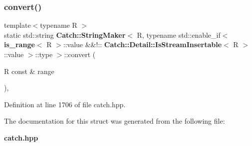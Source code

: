 \subsubsection{convert()}
{\footnotesize\ttfamily template$<$typename R $>$ \\
static std\+::string \textbf{ Catch\+::\+String\+Maker}$<$ R, typename std\+::enable\+\_\+if$<$ \textbf{ is\+\_\+range}$<$ R $>$\+::value \&\&!\+::\textbf{ Catch\+::\+Detail\+::\+Is\+Stream\+Insertable}$<$ R $>$\+::value $>$\+::type $>$\+::convert (\begin{DoxyParamCaption}\item[{R const \&}]{range }\end{DoxyParamCaption})\hspace{0.3cm}{\ttfamily [inline]}, {\ttfamily [static]}}



Definition at line 1706 of file catch.\+hpp.



The documentation for this struct was generated from the following file\+:\begin{DoxyCompactItemize}
\item 
\textbf{ catch.\+hpp}\end{DoxyCompactItemize}
